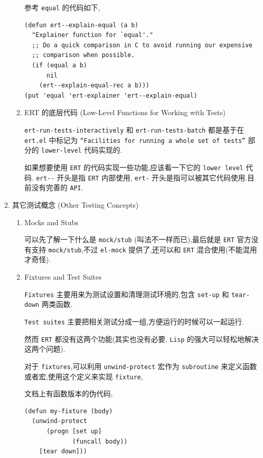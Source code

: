 \documentclass[11pt]{article}
\begin{document}
\begin{enumerate}
\begin{enumerate}
参考 \texttt{equal} 的代码如下,

\begin{verbatim}
(defun ert--explain-equal (a b)
  "Explainer function for `equal'."
  ;; Do a quick comparison in C to avoid running our expensive
  ;; comparison when possible.
  (if (equal a b)
      nil
    (ert--explain-equal-rec a b)))
(put 'equal 'ert-explainer 'ert--explain-equal)
\end{verbatim}


\item ERT 的底层代码 (Low-Level Functions for Working with Tests)
\label{sec:org644edee}

\texttt{ert-run-tests-interactively} 和 \texttt{ert-run-tests-batch} 都是基于在 \texttt{ert.el} 中标记为 \texttt{“Facilities for running a whole set of tests”} 部分的 \texttt{lower-level} 代码实现的.

如果想要使用 \texttt{ERT} 的代码实现一些功能,应该看一下它的 \texttt{lower level} 代码. \texttt{ert-{}-{}} 开头是指 \texttt{ERT} 内部使用, \texttt{ert-} 开头是指可以被其它代码使用.目前没有完善的 \texttt{API}.
\end{enumerate}


\item 其它测试概念 (Other Testing Concepts)
\label{sec:orgfa5df2c}

\begin{enumerate}
\item Mocks and Stubs
\label{sec:org79689db}

可以先了解一下什么是 \texttt{mock/stub} (叫法不一样而已),最后就是 \texttt{ERT} 官方没有支持 \texttt{mock/stub},不过 \texttt{el-mock} 提供了,还可以和 \texttt{ERT} 混合使用(不能混用才奇怪).


\item Fixtures and Test Suites
\label{sec:orgae0a05f}

\texttt{Fixtures} 主要用来为测试设置和清理测试环境的,包含 \texttt{set-up} 和 \texttt{tear-down} 两类函数.

\texttt{Test suites} 主要把相关测试分成一组,方便运行的时候可以一起运行.

然而 \texttt{ERT} 都没有这两个功能(其实也没有必要, \texttt{Lisp} 的强大可以轻松地解决这两个问题).

对于 \texttt{fixtures},可以利用 \texttt{unwind-protect} 宏作为 \texttt{subroutine} 来定义函数或者宏,使用这个定义来实现 \texttt{fixture},

文档上有函数版本的伪代码,

\begin{verbatim}
(defun my-fixture (body)
  (unwind-protect
      (progn [set up]
             (funcall body))
    [tear down]))


\end{verbatim}
\end{enumerate}
\end{enumerate}
\end{document}
